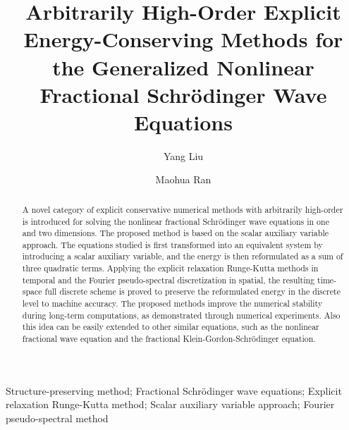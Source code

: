 \documentclass[preprint,compress,3p,10pt,fleqn]{elsarticle}
\numberwithin{equation}{section}
\begin{document}
\begin{frontmatter}

\title{Arbitrarily High-Order Explicit Energy-Conserving Methods for the Generalized Nonlinear Fractional Schr{\"o}dinger Wave Equations}
\author[myaddress]{Yang Liu}

\author[myaddress,mysecondaddress]{Maohua Ran}



\address[myaddress]{School of Mathematical Sciences and V.C. and V.R. Key Lab, Sichuan Normal University, Chengdu 610068, China}
\address[mysecondaddress]{School of Mathematics, Aba Teachers University, Aba 623002, China}


\begin{abstract}
A novel category of explicit conservative numerical methods with arbitrarily high-order is introduced
for solving the nonlinear fractional Schr{\"o}dinger wave equations in one and two dimensions.
The proposed method is based on the scalar auxiliary variable approach. The equations studied is first
transformed into an equivalent system by introducing a scalar auxiliary variable, and the energy is
then reformulated as a sum of three quadratic terms. Applying the explicit
relaxation Runge-Kutta methods in temporal and the Fourier pseudo-spectral discretization in spatial,	the resulting time-space
full discrete scheme is proved to preserve the reformulated energy in the discrete level to machine
accuracy. The proposed methods improve the numerical stability during long-term computations, as demonstrated through numerical experiments.
Also this idea can be easily extended to other similar equations, such as the nonlinear
fractional  wave equation and the fractional Klein-Gordon-Schr{\"o}dinger equation.
\end{abstract}
	
\begin{keyword}
Structure-preserving method; Fractional Schr{\"o}dinger wave equations; Explicit relaxation Runge-Kutta method; Scalar auxiliary variable approach; Fourier pseudo-spectral method
\end{keyword}
	
\end{frontmatter}
	
\end{document}

